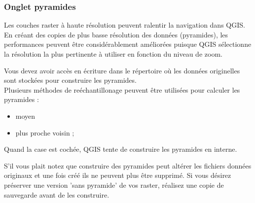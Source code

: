 \subsubsection{Onglet pyramides}\label{raster_pyramids}

Les couches raster à haute résolution peuvent ralentir la navigation dans QGIS.
En créant des copies de plus basse résolution des données (pyramides), les
performances peuvent être considérablement améliorées puisque QGIS sélectionne
la résolution la plus pertinente à utiliser en fonction du niveau de zoom.


Vous devez avoir accès en écriture dans le répertoire où les données
originelles sont stockées pour construire les pyramides. \\
Plusieurs méthodes de reéchantillonage peuvent être utilisées pour calculer les
pyramides :
\begin{itemize}
\item moyen
\item plus proche voisin ;
\end{itemize}

Quand la case  est
cochée, QGIS tente de construire les pyramides en interne.

S'il vous plait notez que construire des pyramides peut altérer les fichiers
données originaux et une fois créé ils ne peuvent plus être supprimé. Si vous
désirez préserver une version 'sans pyramide' de vos raster, réalisez une copie
de sauvegarde avant de les construire.

